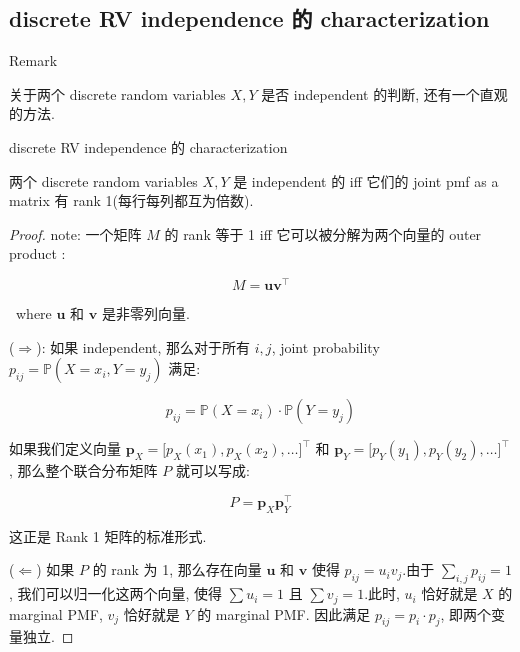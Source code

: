\documentclass{qlnotes-export}
\begin{document}
\subsection{discrete RV independence 的 characterization}\label{discrete-rv-independence-ux7684-characterization}

\begin{qlremark}{Remark}

关于两个 discrete random variables \(X,Y\) 是否 independent 的判断, 还有一个直观的方法.

\begin{proposition}{discrete RV independence 的 characterization}\label{prop-03-joint-conditional-distribution-discrete-rv-independence-characterization}

两个 discrete random variables \(X,Y\) 是 independent 的 iff 它们的 joint pmf as a matrix 有 rank 1(每行每列都互为倍数).

\end{proposition}

\begin{proof}

note: 一个矩阵 \(M\) 的 rank 等于 1 iff 它可以被分解为两个向量的 outer product :

\[M = \mathbf{u}\mathbf{v}^{\top}\]

~where \(\mathbf{u}\) 和 \(\mathbf{v}\) 是非零列向量.

(\(\Longrightarrow\)): 如果 independent, 那么对于所有 \(i,j\), joint probability \(p_{ij} = {\mathbb{P}}(X = x_{i},Y = y_{j})\) 满足:

\[p_{ij} = {\mathbb{P}}(X = x_{i}) \cdot {\mathbb{P}}(Y = y_{j})\]

如果我们定义向量 \(\mathbf{p}_{X} = \lbrack p_{X}(x_{1}),p_{X}(x_{2}),\ldots\rbrack^{\top}\) 和 \(\mathbf{p}_{Y} = \lbrack p_{Y}(y_{1}),p_{Y}(y_{2}),\ldots\rbrack^{\top}\), 那么整个联合分布矩阵 \(P\) 就可以写成:

\[P = \mathbf{p}_{X}\mathbf{p}_{Y}^{\top}\]

这正是 Rank 1 矩阵的标准形式.

(\(\Longleftarrow\)) 如果 \(P\) 的 rank 为 1, 那么存在向量 \(\mathbf{u}\) 和 \(\mathbf{v}\) 使得 \(p_{ij} = u_{i}v_{j}\).由于 \(\sum_{i,j}p_{ij} = 1\), 我们可以归一化这两个向量, 使得 \(\sum u_{i} = 1\) 且 \(\sum v_{j} = 1\).此时, \(u_{i}\) 恰好就是 \(X\) 的 marginal PMF, \(v_{j}\) 恰好就是 \(Y\) 的 marginal PMF. 因此满足 \(p_{ij} = p_{i} \cdot p_{j}\), 即两个变量独立.


\end{proof}
\end{qlremark}
\end{document}
